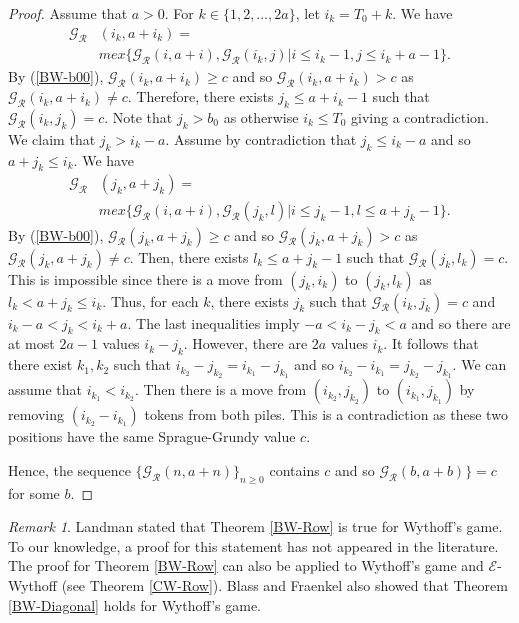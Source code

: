 \documentclass[12pt]{amsart}
\theoremstyle{plain}
\theoremstyle{definition}
\theoremstyle{remark}
\newtheorem{remark}{Remark}
\begin{document}
\begin{proof}
Assume that $a > 0$. For $k \in  \{1, 2, \ldots, 2a\}$, let $i_k = T_0+k$. We have
\begin{align*}
{\mathcal{G}}_{\mathcal{R}}&(i_k,a+i_k) =   \\
       &mex\{{\mathcal{G}}_{\mathcal{R}}(i,a+i), {\mathcal{G}}_{\mathcal{R}}(i_k,j) | i \leq i_k-1, j \leq i_k+a-1\}.
\end{align*}
By (\ref{BW-b00}), ${\mathcal{G}}_{\mathcal{R}}(i_k,a+i_k) \geq c$ and so ${\mathcal{G}}_{\mathcal{R}}(i_k,a+i_k) > c$ as ${\mathcal{G}}_{\mathcal{R}}(i_k,a+i_k) \neq c$. Therefore, there exists $j_k \leq a+i_k-1$ such that ${\mathcal{G}}_{\mathcal{R}}(i_k,j_k) = c$. Note that $j_k > b_0$ as otherwise $i_k \leq T_0$ giving a contradiction. We claim that $j_k > i_k-a$. Assume by contradiction that $j_k \leq i_k - a$ and so $a+j_k \leq i_k$. We have
\begin{align*}
{\mathcal{G}}_{\mathcal{R}}&(j_k,a+j_k) =   \\
       &mex\{{\mathcal{G}}_{\mathcal{R}}(i,a+i), {\mathcal{G}}_{\mathcal{R}}(j_k,l) | i \leq j_k-1, l \leq a+j_k-1\}.
\end{align*}
By (\ref{BW-b00}), ${\mathcal{G}}_{\mathcal{R}}(j_k,a+j_k) \geq c$ and so ${\mathcal{G}}_{\mathcal{R}}(j_k,a+j_k) > c$ as ${\mathcal{G}}_{\mathcal{R}}(j_k,a+j_k) \neq c$. Then, there exists $l_k \leq a+j_k-1$ such that ${\mathcal{G}}_{\mathcal{R}}(j_k,l_k) = c$. This is impossible since there is a move from $(j_k,i_k)$ to $(j_k,l_k)$ as $l_k < a+j_k \leq i_k$. Thus, for each $k$, there exists $j_k$ such that ${\mathcal{G}}_{\mathcal{R}}(i_k,j_k) = c$ and $i_k-a < j_k < i_k+a$. The last inequalities imply $-a < i_k - j_k < a$ and so there are at most $2a-1$ values $i_k - j_k$. However, there are $2a$ values $i_k$. It follows that there exist $k_1, k_2$ such that $i_{k_2} - j_{k_2} = i_{k_1} - j_{k_1}$ and so $i_{k_2} - i_{k_1} = j_{k_2} - j_{k_1}$. We can assume that $i_{k_1} < i_{k_2}$. Then there is a move from $(i_{k_2}, j_{k_2})$ to $(i_{k_1}, j_{k_1})$ by removing $(i_{k_2} - i_{k_1})$ tokens from both piles. This is a contradiction as these two positions have the same Sprague-Grundy value $c$.

Hence, the sequence $\{{\mathcal{G}}_{\mathcal{R}}(n,a+n)\}_{n \geq 0}$ contains $c$ and so ${\mathcal{G}}_{\mathcal{R}}(b,a+b)\} = c$ for some $b$.

\end{proof}

\smallskip
\begin{remark} \label{BW-Remark1}
Landman \cite{landman} stated that Theorem \ref{BW-Row} is true for Wythoff's game. To our knowledge, a proof for this statement has not appeared in the literature. The proof for Theorem \ref{BW-Row} can also be applied to Wythoff's game and ${\mathcal{E}}$-Wythoff (see Theorem \ref{CW-Row}). Blass and Fraenkel \cite{blass} also showed that Theorem \ref{BW-Diagonal} holds for Wythoff's game.
\end{remark}
\end{document}

